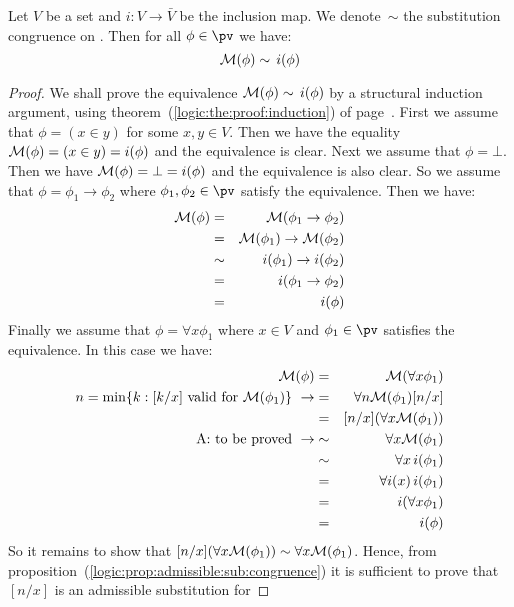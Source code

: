 \begin{prop}\label{logic:prop:FOPL:mintransform:eqivalence}
Let $V$ be a set and $i:V\to\bar{V}$ be the inclusion map. We
denote~$\sim$ the substitution congruence on \pvb. Then for all
$\phi\in\pv$ we have:
    \[
    {\cal M}(\phi)\sim\, i(\phi)
    \]
\end{prop}
\begin{proof}
We shall prove the equivalence ${\cal M}(\phi)\sim\, i(\phi)$ by a
structural induction argument, using
theorem~(\ref{logic:the:proof:induction}) of
page~\pageref{logic:the:proof:induction}. First we assume that
$\phi=(x\in y)$ for some $x,y\in V$. Then we have the equality
${\cal M}(\phi)=(x\in y)=i(\phi)$ and the equivalence is clear. Next
we assume that $\phi=\bot$. Then we have ${\cal
M}(\phi)=\bot=i(\phi)$ and the equivalence is also clear. So we
assume that $\phi=\phi_{1}\to\phi_{2}$ where
$\phi_{1},\phi_{2}\in\pv$ satisfy the equivalence. Then we have:
    \begin{eqnarray*}
    {\cal M}(\phi)&=&{\cal M}(\phi_{1}\to\phi_{2})\\
    &=&{\cal M}(\phi_{1})\to{\cal M}(\phi_{2})\\
    &\sim&i(\phi_{1})\to i(\phi_{2})\\
    &=&i(\phi_{1}\to\phi_{2})\\
    &=&i(\phi)
    \end{eqnarray*}
Finally we assume that $\phi=\forall x\phi_{1}$ where $x\in V$ and
$\phi_{1}\in\pv$ satisfies the equivalence. In this case we have:
    \begin{eqnarray*}
    {\cal M}(\phi)&=&{\cal M}(\forall x\phi_{1})\\
    n=\min\{k:[k/x]\mbox{ valid for }{\cal M}(\phi_{1})\}\
    \rightarrow
    &=&\forall n{\cal M}(\phi_{1})[n/x]\\
    &=&[n/x](\forall x{\cal M}(\phi_{1}))\\
    \mbox{A: to be proved}\ \rightarrow
    &\sim&\forall x{\cal M}(\phi_{1})\\
    &\sim&\forall x\, i(\phi_{1})\\
    &=&\forall i(x)\, i(\phi_{1})\\
    &=&i(\forall x\phi_{1})\\
    &=&i(\phi)
    \end{eqnarray*}
So it remains to show that $[n/x](\forall x{\cal
M}(\phi_{1}))\sim\forall x{\cal M}(\phi_{1})$. Hence, from
proposition~(\ref{logic:prop:admissible:sub:congruence}) it is
sufficient to prove that $[n/x]$ is an admissible substitution for

\end{proof}
